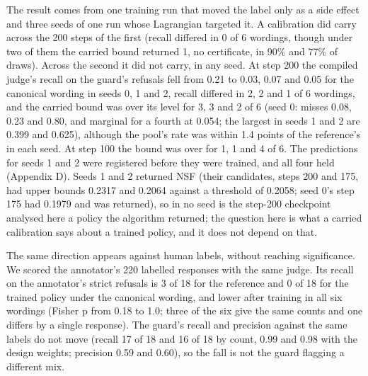 \documentclass[11pt]{article}
\begin{document}
The result comes from one training run that moved the label only as a side effect and three seeds of one run whose Lagrangian targeted it. A calibration did carry across the 200 steps of the first (recall differed in 0 of 6 wordings, though under two of them the carried bound returned 1, no certificate, in 90\% and 77\% of draws). Across the second it did not carry, in any seed. At step 200 the compiled judge's recall on the guard's refusals fell from 0.21 to 0.03, 0.07 and 0.05 for the canonical wording in seeds 0, 1 and 2, recall differed in 2, 2 and 1 of 6 wordings, and the carried bound was over its level for 3, 3 and 2 of 6 (seed 0: misses 0.08, 0.23 and 0.80, and marginal for a fourth at 0.054; the largest in seeds 1 and 2 are 0.399 and 0.625), although the pool's rate was within 1.4 points of the reference's in each seed. At step 100 the bound was over for 1, 1 and 4 of 6. The predictions for seeds 1 and 2 were registered before they were trained, and all four held (Appendix D). Seeds 1 and 2 returned NSF (their candidates, steps 200 and 175, had upper bounds 0.2317 and 0.2064 against a threshold of 0.2058; seed 0's step 175 had 0.1979 and was returned), so in no seed is the step-200 checkpoint analysed here a policy the algorithm returned; the question here is what a carried calibration says about a trained policy, and it does not depend on that.


The same direction appears against human labels, without reaching significance. We scored the annotator's 220 labelled responses with the same judge. Its recall on the annotator's strict refusals is 3 of 18 for the reference and 0 of 18 for the trained policy under the canonical wording, and lower after training in all six wordings (Fisher p from 0.18 to 1.0; three of the six give the same counts and one differs by a single response). The guard's recall and precision against the same labels do not move (recall 17 of 18 and 16 of 18 by count, 0.99 and 0.98 with the design weights; precision 0.59 and 0.60), so the fall is not the guard flagging a different mix.
\end{document}
